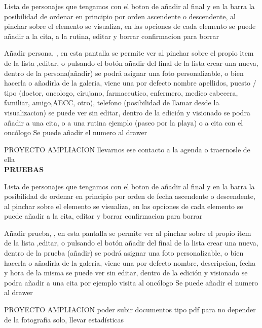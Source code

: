 \documentclass[../pfc.tex]{subfiles}
\begin{document}
	Lista de personajes que tengamos con el boton de añadir al final y en la barra la posibilidad de ordenar en principio por orden ascendente o descendente,
	al pinchar sobre el elemento se visualiza, 
	en las opciones de cada elemento se puede añadir a la cita, a la rutina, editar y borrar confirmacion para borrar
	
	Añadir persona, , en esta pantalla se permite ver al pinchar sobre el propio item de la lista ,editar, o pulsando el botón añadir del final de la lista crear una nueva, 
	dentro de la persona(añadir) se podrá asignar una foto personalizable, o bien hacerla o añadirla de la galeria, viene una por defecto
	nombre apellidos, puesto / tipo (doctor, oncologo, cirujano, farmaceutico, enfermero, medico cabecera, familiar, amigo,AECC, otro), telefono (posibilidad de llamar desde la visualizacion)
	se puede ver sin editar, dentro de la edición y visionado se podra añadir a una cita, o a una rutina ejemplo (paseo por la playa) o a cita con el oncólogo
	Se puede añadir el numero al drawer
	
	PROYECTO AMPLIACION llevarnos ese contacto a la agenda o traernosle de ella\\
	
	



	





	



	\textbf{PRUEBAS}
	
	Lista de personajes que tengamos con el boton de añadir al final y en la barra la posibilidad de ordenar en principio por orden de fecha ascendente o descendente,
	al pinchar sobre el elemento se visualiza, 
	en las opciones de cada elemento se puede añadir a la cita, editar y borrar confirmacion para borrar
	
	Añadir prueba, , en esta pantalla se permite ver al pinchar sobre el propio item de la lista ,editar, o pulsando el botón añadir del final de la lista crear una nueva, 
	dentro de la prueba (añadir) se podrá asignar una foto personalizable, o bien hacerla o añadirla de la galeria, viene una por defecto
	nombre, descripcion,
	fecha y hora de la misma
	se puede ver sin editar, dentro de la edición y visionado se podra añadir a una cita por ejemplo visita al oncólogo
	Se puede añadir el numero al drawer
	
	PROYECTO AMPLIACION poder subir documentos tipo pdf para no depender de la fotografia solo, llevar estadísticas\\
	
\end{document}
